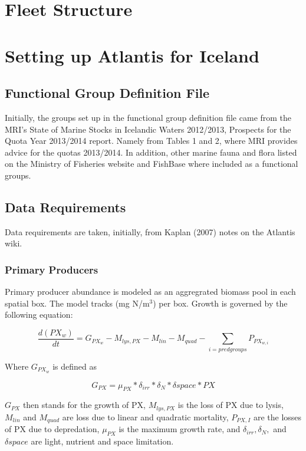 \documentclass{report}
\begin{document}
\section{Fleet Structure}

\section{Setting up Atlantis for Iceland}

\subsection{Functional Group Definition File}

Initially, the groups set up in the functional group definition file came from the MRI's State of Marine Stocks in Icelandic Waters 2012/2013, Prospects for the Quota Year 2013/2014 report. Namely from Tables 1 and 2, where MRI provides advice for the quotas 2013/2014. In addition, other marine fauna and flora listed on the Ministry of Fisheries website \cite{is_fish} and FishBase \cite{fishdb} where included as a functional groups. 

\subsection{Data Requirements}

Data requirements are taken, initially, from Kaplan (2007) notes on the Atlantis wiki.

\subsubsection{Primary Producers}

Primary producer abundance is modeled as an aggregrated biomass pool in each spatial box. The model tracks (mg N/m$^3$) per box. Growth is governed by the following equation:

\begin{equation}
\frac{d(PX_w)}{dt} = G_{PX_w} - M_{lys,PX} - M_{lin} - M_{quad} - \sum_{i = pred groups}{P_{PX_{w,i}}}
\end{equation}

Where $G_{PX_w}$ is defined as

\begin{equation}
G_{PX} = \mu_{PX} * \delta_{irr} * \delta_{N} * \delta{space} * PX
\end{equation}

$G_{PX}$ then stands for the growth of PX, $M_{lys,PX}$ is the loss of PX due to lysis, $M_{lin}$ and $M_{quad}$ are loss due to linear and quadratic mortality, $P_{PX,I}$ are the losses of PX due to depredation, $\mu_{PX}$ is the maximum growth rate, and $\delta_{irr}, \delta_{N},$ and $\delta{space}$ are light, nutrient and space limitation. 
\end{document}
